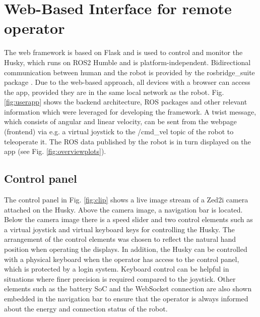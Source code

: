 \documentclass[letterpaper, 10 pt, conference]{ieeeconf}  %
\begin{document}
\section{Web-Based Interface for remote operator}
\label{sec:framework}

The web framework is based on Flask \cite{flask} and is used to control and monitor the Husky, which runs on ROS2 Humble and is platform-independent. 
Bidirectional communication between human and the robot is provided by the rosbridge\_suite package \cite{rosbridgeSuite}.   
Due to the web-based approach, all devices with a browser can access the app, provided they are in the same local network as the robot.
Fig. \ref{fig:userapp} shows the backend architecture, ROS packages and other relevant information which were leveraged for developing the framework. 
A twist message, which consists of angular and linear velocity, can be sent from the webpage (frontend) via e.g. 
a virtual joystick to the /cmd\_vel topic of the robot to teleoperate it. The ROS data published by the robot is in turn displayed on the app (see Fig. \ref{fig:overviewplots}).



\subsection{Control panel}
The control panel in Fig. \ref{fig:clip} shows a live image stream of a Zed2i camera attached on the Husky. Above the camera image, a navigation bar is located. 
Below the camera image there is a speed slider and two control elements such as a virtual joystick and virtual keyboard keys for controlling the Husky. The arrangement of the control elements was chosen to reflect the natural hand position when operating the displays.
In addition, the Husky can be controlled with a physical keyboard when the operator has access to the control panel, which is protected by a login system. Keyboard control can be helpful in situations where finer precision is required compared to the joystick.
Other elements such as the battery SoC and the WebSocket connection are also shown embedded in the navigation bar to ensure that the operator is always informed about the energy and connection status of the robot.
\end{document}
